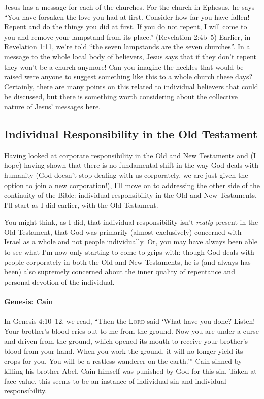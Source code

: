 Jesus has a message for each of the churches. For the church in Ephesus, he says
\enquote{You have forsaken the love you had at first. Consider how far you have
fallen! Repent and do the things you did at first. If you do not repent, I will
come to you and remove your lampstand from its place.} (Revelation 2:4b--5)
Earlier, in Revelation 1:11, we're told \enquote{the seven lampstands are the
seven churches}. In a message to the whole local body of believers, Jesus says
that if they don't repent they won't be a church anymore! Can you imagine the
heckles that would be raised were anyone to suggest something like this to a
whole church these days? Certainly, there are many points on this related to
individual believers that could be discussed, but there is something worth
considering about the collective nature of Jesus' messages here.



\subsection{Individual Responsibility in the Old Testament}

Having looked at corporate responsibility in the Old and New Testaments and (I
hope) having shown that there is no fundamental shift in the way God deals with
humanity (God doesn't stop dealing with us corporately, we are just given the
option to join a new corporation!), I'll move on to addressing the other side of
the continuity of the Bible: individual responsibility in the Old and New
Testaments. I'll start as I did earlier, with the Old Testament.

You might think, as I did, that individual responsibility isn't \emph{really}
present in the Old Testament, that God was primarily (almost exclusively)
concerned with Israel as a whole and not people individually. Or, you may have
always been able to see what I'm now only starting to come to grips with: though
God deals with people corporately in both the Old and New Testaments, he is (and
always has been) also supremely concerned about the inner quality of repentance
and personal devotion of the individual.

\paragraph{Genesis: Cain} In Genesis 4:10--12, we read, \enquote{Then the
\textsc{Lord} said \enquote{What have you done? Listen! Your brother's blood
cries out to me from the ground. Now you are under a curse and driven from the
ground, which opened its mouth to receive your brother's blood from your hand.
When you work the ground, it will no longer yield its crops for you. You will be
a restless wanderer on the earth.}} Cain sinned by killing his brother Abel.
Cain himself was punished by God for this sin. Taken at face value, this seems
to be an instance of individual sin and individual responsibility.

